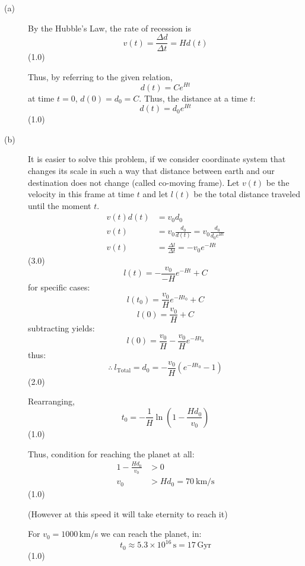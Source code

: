 \begin{description}
\item[(a)] By the Hubble's Law, the rate of recession is
  \[ v(t) = \frac{\Delta d}{\Delta t} = H d(t) \]
  \hfill(1.0)

  Thus, by referring to the given relation,
  \[ d(t) = C e^{Ht} \]
  at time $t = 0$, $d(0) = d_0 = C$. Thus, the distance at a time $t$:
  \[ d(t) = d_0 e^{Ht} \]
  \hfill(1.0)

\item[(b)] It is easier to solve this problem, if we consider coordinate
  system that changes its scale in such a way that distance between earth
  and our destination does not change (called co-moving frame). Let $v(t)$
  be the velocity in this frame at time $t$ and let $l(t)$ be the total
  distance traveled until the moment $t$.
  \begin{align*}
  v(t)d(t) &= v_0 d_0\\
  v(t) &= v_0\frac{d_0}{d(t)} = v_0\frac{d_0}{d_0 e^{Ht}}\\
  v(t) &= \frac{\Delta l}{\Delta t} = -v_0 e^{-Ht}
  \end{align*}
  \hfill(3.0)
  \[ l(t) = -\frac{v_0}{-H}e^{-Ht} + C \]
  for specific cases:
  \[ l(t_0) = \frac{v_0}{H}e^{-Ht_0} + C \]
  \[ l(0) = \frac{v_0}{H} + C \]
  subtracting yields:
  \[ l(0) = \frac{v_0}{H} - \frac{v_0}{H}e^{-Ht_0} \]
  thus:
  \[ \therefore\ l_{\mathrm{Total}} = d_0 = -\frac{v_0}{H}(e^{-Ht_0} - 1) \]
  \hfill(2.0)

  Rearranging,
  \[ t_0 = -\frac{1}{H}\ln\left(1 - \frac{H d_0}{v_0}\right) \]
  \hfill(1.0)

  Thus, condition for reaching the planet at all:
  \begin{align*}
  1 - \frac{H d_0}{v_0} &> 0\\
  v_0 &> H d_0 = 70\ \mathrm{km/s}
  \end{align*}
  \hfill(1.0)

  (However at this speed it will take eternity to reach it)

  For $v_0 = 1000$\,km/s we can reach the planet, in:
  \[ t_0 \approx 5.3\times 10^{16}\,\mathrm{s} = 17\,\mathrm{Gyr} \]
  \hfill(1.0)
\end{description}
